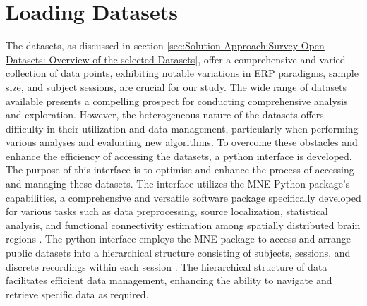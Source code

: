 \section{Loading Datasets}
\label{sec:Framework:Loading Datasets}
The datasets, as discussed in section \ref{sec:Solution Approach:Survey Open Datasets: Overview of the selected Datasets}, offer a comprehensive and varied collection of data points, exhibiting notable variations in ERP paradigms, sample size, and subject sessions, are crucial for our study. The wide range of datasets available presents a compelling prospect for conducting comprehensive analysis and exploration. However, the heterogeneous nature of the datasets offers difficulty in their utilization and data management, particularly when performing various analyses and evaluating new algorithms.
To overcome these obstacles and enhance the efficiency of accessing the datasets, a python interface is developed. The purpose of this interface is to optimise and enhance the process of accessing and managing these datasets. The interface utilizes the MNE Python package's capabilities, a comprehensive and versatile software package specifically developed for various tasks such as data preprocessing, source localization, statistical analysis, and functional connectivity estimation among spatially distributed brain regions \cite{MNE_package}. The python interface employs the MNE package to access and arrange public datasets into a hierarchical structure consisting of subjects, sessions, and discrete recordings within each session \cite{moabb}.  The hierarchical structure of data facilitates efficient data management, enhancing the ability to navigate and retrieve specific data as required.
\smallskip

